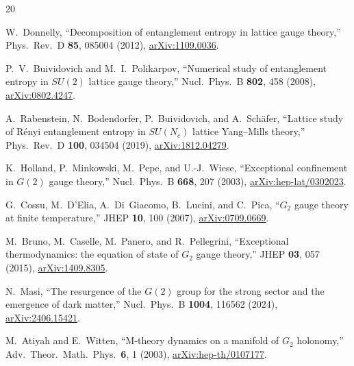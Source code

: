 \documentclass[twocolumn,prd,nofootinbib]{revtex4-2}
\begin{document}
\begin{thebibliography}{20}

W.~Donnelly,
``Decomposition of entanglement entropy in lattice gauge theory,''
Phys.\ Rev.\ D \textbf{85}, 085004 (2012),
\href{https://arxiv.org/abs/1109.0036}{arXiv:1109.0036}.

P.~V.~Buividovich and M.~I.~Polikarpov,
``Numerical study of entanglement entropy in $SU(2)$ lattice gauge theory,''
Nucl.\ Phys.\ B \textbf{802}, 458 (2008),
\href{https://arxiv.org/abs/0802.4247}{arXiv:0802.4247}.

A.~Rabenstein, N.~Bodendorfer, P.~Buividovich, and A.~Sch\"afer,
``Lattice study of R\'enyi entanglement entropy in $SU(N_c)$ lattice Yang--Mills theory,''
Phys.\ Rev.\ D \textbf{100}, 034504 (2019),
\href{https://arxiv.org/abs/1812.04279}{arXiv:1812.04279}.

K.~Holland, P.~Minkowski, M.~Pepe, and U.-J.~Wiese,
``Exceptional confinement in $G(2)$ gauge theory,''
Nucl.\ Phys.\ B \textbf{668}, 207 (2003),
\href{https://arxiv.org/abs/hep-lat/0302023}{arXiv:hep-lat/0302023}.

G.~Cossu, M.~D'Elia, A.~Di~Giacomo, B.~Lucini, and C.~Pica,
``$G_2$ gauge theory at finite temperature,''
JHEP \textbf{10}, 100 (2007),
\href{https://arxiv.org/abs/0709.0669}{arXiv:0709.0669}.

M.~Bruno, M.~Caselle, M.~Panero, and R.~Pellegrini,
``Exceptional thermodynamics: the equation of state of $G_2$ gauge theory,''
JHEP \textbf{03}, 057 (2015),
\href{https://arxiv.org/abs/1409.8305}{arXiv:1409.8305}.

N.~Masi,
``The resurgence of the $G(2)$ group for the strong sector and the emergence of dark matter,''
Nucl.\ Phys.\ B \textbf{1004}, 116562 (2024),
\href{https://arxiv.org/abs/2406.15421}{arXiv:2406.15421}.

M.~Atiyah and E.~Witten,
``M-theory dynamics on a manifold of $G_2$ holonomy,''
Adv.\ Theor.\ Math.\ Phys.\ \textbf{6}, 1 (2003),
\href{https://arxiv.org/abs/hep-th/0107177}{arXiv:hep-th/0107177}.

\end{thebibliography}
\end{document}
